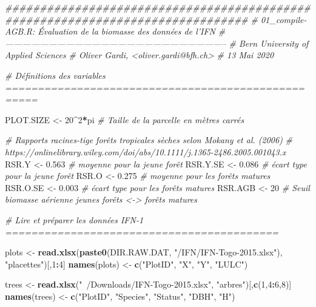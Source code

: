 \documentclass[a4paper, notitlepage, 12pt, krantz2]{krantz}
\newenvironment{Shaded}{\begin{snugshade}}{\end{snugshade}}
\newcommand{\CommentTok}[1]{\textcolor[rgb]{0.56,0.35,0.01}{\textit{#1}}}
\newcommand{\DecValTok}[1]{\textcolor[rgb]{0.00,0.00,0.81}{#1}}
\newcommand{\FloatTok}[1]{\textcolor[rgb]{0.00,0.00,0.81}{#1}}
\newcommand{\KeywordTok}[1]{\textcolor[rgb]{0.13,0.29,0.53}{\textbf{#1}}}
\newcommand{\NormalTok}[1]{#1}
\newcommand{\OperatorTok}[1]{\textcolor[rgb]{0.81,0.36,0.00}{\textbf{#1}}}
\newcommand{\StringTok}[1]{\textcolor[rgb]{0.31,0.60,0.02}{#1}}
\begin{document}
\begin{Shaded}
\begin{Highlighting}[]
\CommentTok{###############################################################################}
\CommentTok{# 01_compile-AGB.R: Évaluation de la biomasse des données de l'IFN}
\CommentTok{# -----------------------------------------------------------------------------}
\CommentTok{# Bern University of Applied Sciences}
\CommentTok{# Oliver Gardi, <oliver.gardi@bfh.ch>}
\CommentTok{# 13 Mai 2020}

\CommentTok{# Définitions des variables ===================================================}

\NormalTok{PLOT.SIZE <-}\StringTok{ }\DecValTok{20}\OperatorTok{^}\DecValTok{2}\OperatorTok{*}\NormalTok{pi  }\CommentTok{# Taille de la parcelle en mètres carrés}

\CommentTok{# Rapports racines-tige forêts tropicales sèches selon Mokany et al. (2006)}
\CommentTok{# https://onlinelibrary.wiley.com/doi/abs/10.1111/j.1365-2486.2005.001043.x}
\NormalTok{RSR.Y    <-}\StringTok{ }\FloatTok{0.563}     \CommentTok{# moyenne pour la jeune forêt      }
\NormalTok{RSR.Y.SE <-}\StringTok{ }\FloatTok{0.086}     \CommentTok{# écart type pour la jeune forêt  }
\NormalTok{RSR.O    <-}\StringTok{ }\FloatTok{0.275}     \CommentTok{# moyenne pour les forêts matures }
\NormalTok{RSR.O.SE <-}\StringTok{ }\FloatTok{0.003}     \CommentTok{# écart type pour les forêts matures}
\NormalTok{RSR.AGB  <-}\StringTok{ }\DecValTok{20}        \CommentTok{# Seuil biomasse aérienne jeunes forêts <-> forêts matures}


\CommentTok{# Lire et préparer les données IFN-1 ==========================================}

\NormalTok{plots <-}\StringTok{ }\KeywordTok{read.xlsx}\NormalTok{(}\KeywordTok{paste0}\NormalTok{(DIR.RAW.DAT, }\StringTok{"/IFN/IFN-Togo-2015.xlsx"}\NormalTok{), }\StringTok{"placettes"}\NormalTok{)[,}\DecValTok{1}\OperatorTok{:}\DecValTok{4}\NormalTok{]}
\KeywordTok{names}\NormalTok{(plots) <-}\StringTok{ }\KeywordTok{c}\NormalTok{(}\StringTok{"PlotID"}\NormalTok{, }\StringTok{"X"}\NormalTok{, }\StringTok{"Y"}\NormalTok{, }\StringTok{"LULC"}\NormalTok{)}

\NormalTok{trees <-}\StringTok{ }\KeywordTok{read.xlsx}\NormalTok{(}\StringTok{"~/Downloads/IFN-Togo-2015.xlsx"}\NormalTok{, }\StringTok{"arbres"}\NormalTok{)[,}\KeywordTok{c}\NormalTok{(}\DecValTok{1}\NormalTok{,}\DecValTok{4}\OperatorTok{:}\DecValTok{6}\NormalTok{,}\DecValTok{8}\NormalTok{)]}
\KeywordTok{names}\NormalTok{(trees) <-}\StringTok{ }\KeywordTok{c}\NormalTok{(}\StringTok{"PlotID"}\NormalTok{, }\StringTok{"Species"}\NormalTok{, }\StringTok{"Status"}\NormalTok{, }\StringTok{"DBH"}\NormalTok{, }\StringTok{"H"}\NormalTok{)}


\end{Highlighting}
\end{Shaded}
\end{document}

